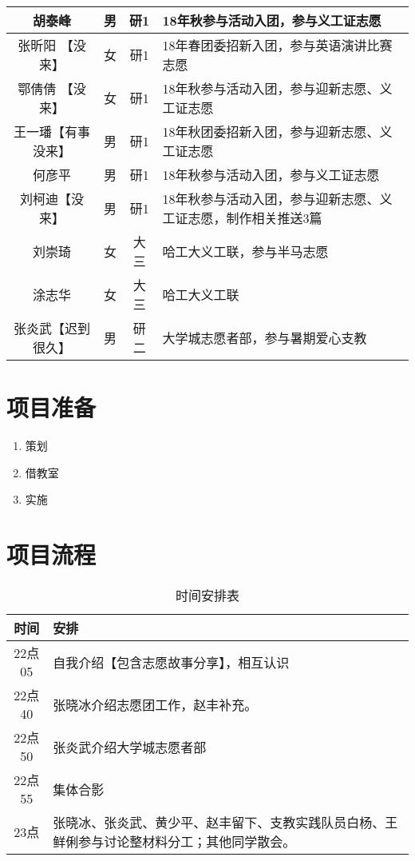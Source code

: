 \documentclass[12pt]{ctexart}
\begin{document}
\begin{itemize}
\begin{longtable}{|c|c|c|p{8cm}|}
\hline
胡泰峰 & 男 & 研1 & 18年秋参与活动入团，参与义工证志愿 \\
\hline
张昕阳 【没来】& 女 & 研1 & 18年春团委招新入团，参与英语演讲比赛志愿 \\
\hline
鄂倩倩 【没来】& 女 & 研1 & 18年秋参与活动入团，参与迎新志愿、义工证志愿 \\
\hline
王一璠【有事没来】  & 男 & 研1 & 18年秋团委招新入团，参与迎新志愿、义工证志愿 \\
\hline
何彦平 & 男 & 研1 &  18年秋参与活动入团，参与义工证志愿 \\
\hline
刘柯迪【没来】 & 男 & 研1 & 18年秋参与活动入团，参与迎新志愿、义工证志愿，制作相关推送3篇 \\
\hline
刘崇琦 & 女 & 大三 & 哈工大义工联，参与半马志愿 \\
\hline
涂志华 & 女 & 大三 & 哈工大义工联 \\
\hline
张炎武【迟到很久】 & 男 & 研二 & 大学城志愿者部，参与暑期爱心支教 \\
\hline
\end{longtable}
\end{itemize}
\section{项目准备}
\begin{enumerate}
\item 策划
\item 借教室
\item 实施
\end{enumerate}
\section{项目流程}
\begin{table}[!ht]
\centering
\begin{tabular}{|c|p{8cm}|}
\hline
时间 & 安排 \\
\hline
22点05  & 自我介绍【包含志愿故事分享】，相互认识 \\
\hline
22点40 & 张晓冰介绍志愿团工作，赵丰补充。\\
\hline
22点50  & 张炎武介绍大学城志愿者部 \\
\hline
22点55 & 集体合影 \\
\hline
23点 & 张晓冰、张炎武、黄少平、赵丰留下、支教实践队员白杨、王鲜俐参与讨论整材料分工；其他同学散会。   \\
\hline
\end{tabular}
\caption{时间安排表}\label{route}
\end{table}
\end{document}
